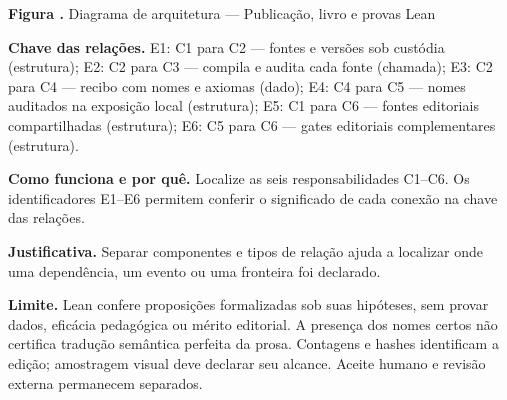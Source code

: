 {\small\textbf{Figura \thefigure.} Diagrama de arquitetura --- Publicação, livro e provas Lean}\par\smallskip
{\footnotesize\textbf{Chave das relações.} E1: C1 para C2 --- fontes e versões sob custódia (estrutura); E2: C2 para C3 --- compila e audita cada fonte (chamada); E3: C2 para C4 --- recibo com nomes e axiomas (dado); E4: C4 para C5 --- nomes auditados na exposição local (estrutura); E5: C1 para C6 --- fontes editoriais compartilhadas (estrutura); E6: C5 para C6 --- gates editoriais complementares (estrutura).}\par\smallskip
\noindent\textbf{Como funciona e por quê.} Localize as seis responsabilidades C1--C6. Os identificadores E1--E6 permitem conferir o significado de cada conexão na chave das relações.\par
\noindent\textbf{Justificativa.} Separar componentes e tipos de relação ajuda a localizar onde uma dependência, um evento ou uma fronteira foi declarado.\par
\noindent\textbf{Limite.} Lean confere proposições formalizadas sob suas hipóteses, sem provar dados, eficácia pedagógica ou mérito editorial. A presença dos nomes certos não certifica tradução semântica perfeita da prosa. Contagens e hashes identificam a edição; amostragem visual deve declarar seu alcance. Aceite humano e revisão externa permanecem separados.\par\smallskip
{}
